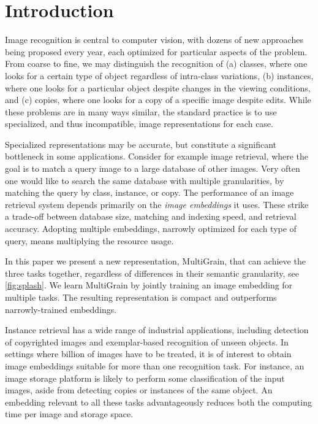 
%
\section{Introduction}\label{sec:intro}

%
%

Image recognition is central to computer vision, with dozens of new approaches being proposed every year, each optimized for particular aspects of the problem.
From coarse to fine, we may distinguish the recognition of
(a) classes, where one looks for a certain type of object regardless of intra-class variations,
(b) instances, where one looks for a particular object despite changes in the viewing conditions,  and
(c) copies, where one looks for a copy of a specific image despite edits.
While these problems are in many ways similar, the standard practice is to use specialized, and thus incompatible, image representations for each case.

Specialized representations may be accurate, but constitute a significant bottleneck in some applications.
Consider for example image retrieval, where the goal is to match a query image to a large database of other images.
Very often one would like to search the same database with multiple granularities, by matching the query by class, instance, or copy.
The performance of an image retrieval system depends primarily on the \emph{image embeddings} it uses. 
These strike a trade-off between database size, matching and indexing speed, and retrieval accuracy.
Adopting multiple embeddings, narrowly optimized for each type of query, means multiplying the resource usage.



In this paper we present a new  representation, MultiGrain, that can achieve the three tasks together, regardless of differences in their semantic granularity, see \cref{fig:splash}.
We learn MultiGrain by jointly training an image embedding for multiple tasks.
The resulting representation is compact and outperforms narrowly-trained embeddings.

Instance retrieval has a wide range of industrial applications, including detection of copyrighted images and exemplar-based recognition of unseen objects.
In settings where billion of images have to be treated, %
it is of interest to obtain image embeddings suitable for more than one recognition task.
For instance, an image storage platform is likely to perform some classification of the input images, aside from detecting copies or instances of the same object.
An embedding relevant to all these tasks advantageously reduces both the computing time per image and storage space.

